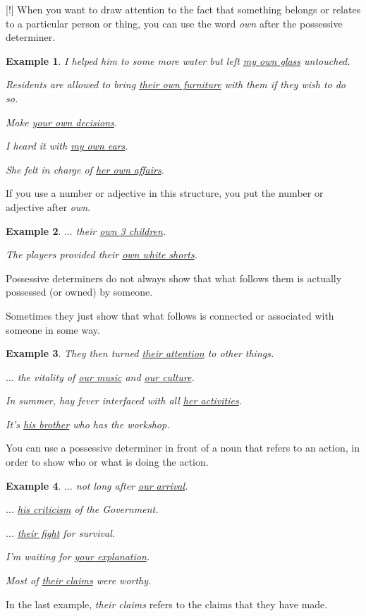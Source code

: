 \documentclass[oneside]{book}
\numberwithin{equation}{section}
\newtheorem{example}{Example}[section]
\begin{document}
%
\noindent{} [!] When you want to draw attention to the fact that something belongs or relates to a particular person or thing, you can use the word \textit{own} after the possessive determiner.
\begin{example}
    I helped him to some more water but left \underline{my own glass} untouched.
    
    Residents are allowed to bring \underline{their own furniture} with them if they wish to do so.
    
    Make \underline{your own decisions}.
    
    I heard it with \underline{my own ears}.
    
    She felt in charge of \underline{her own affairs}.
\end{example}
If you use a number or adjective in this structure, you put the number or adjective after \textit{own}.
\begin{example}
    $\ldots$ their \underline{own 3 children}.
    
    The players provided their \underline{own white shorts}.
\end{example}
%
\noindent{} Possessive determiners do not always show that what follows them is actually possessed (or owned) by someone.

Sometimes they just show that what follows is connected or associated with someone in some way.
\begin{example}
    They then turned \underline{their attention} to other things.
    
    $\ldots$ the vitality of \underline{our music} and \underline{our culture}.
    
    In summer, hay fever interfaced with all \underline{her activities}.
    
    It's \underline{his brother} who has the workshop.
\end{example}
%
\noindent{} You can use a possessive determiner in front of a noun that refers to an action, in order to show who or what is doing the action.
\begin{example}
    $\ldots$ not long after \underline{our arrival}.
    
    $\ldots$ \underline{his criticism} of the Government.
    
    $\ldots$ \underline{their fight} for survival.
    
    I'm waiting for \underline{your explanation}.
    
    Most of \underline{their claims} were worthy.
\end{example}
In the last example, \textit{their claims} refers to the claims that they have made.
\end{document}
